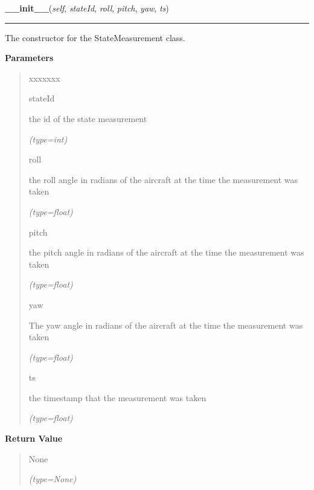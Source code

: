 \hspace{.8\funcindent}\begin{boxedminipage}{\funcwidth}

    \raggedright \textbf{\_\_init\_\_}(\textit{self}, \textit{stateId}, \textit{roll}, \textit{pitch}, \textit{yaw}, \textit{ts})

    \vspace{-1.5ex}

    \rule{\textwidth}{0.5\fboxrule}
\setlength{\parskip}{2ex}
    The constructor for the StateMeasurement class.

\setlength{\parskip}{1ex}
      \textbf{Parameters}
      \vspace{-1ex}

      \begin{quote}
        \begin{Ventry}{xxxxxxx}

          \item[stateId]

          the id of the state measurement

            {\it (type=int)}

          \item[roll]

          the roll angle in radians of the aircraft at the time the 
          measurement was taken

            {\it (type=float)}

          \item[pitch]

          the pitch angle in radians of the aircraft at the time the 
          measurement was taken

            {\it (type=float)}

          \item[yaw]

          The yaw angle in radians of the aircraft at the time the 
          measurement was taken

            {\it (type=float)}

          \item[ts]

          the timestamp that the measurement was taken

            {\it (type=float)}

        \end{Ventry}

      \end{quote}

      \textbf{Return Value}
    \vspace{-1ex}

      \begin{quote}
      None

      {\it (type=None)}

      \end{quote}

    \end{boxedminipage}

